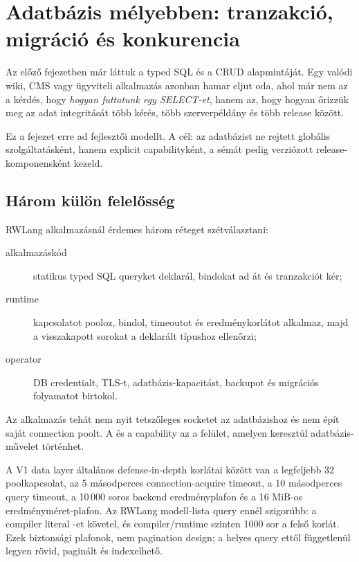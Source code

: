 \chapter{Adatbázis mélyebben: tranzakció, migráció és konkurencia}\label{ch:db-deep-dive-hu}

Az előző fejezetben már láttuk a typed SQL és a CRUD alapmintáját. Egy valódi wiki, CMS vagy ügyviteli alkalmazás azonban hamar eljut oda, ahol már nem az a kérdés, hogy \emph{hogyan futtatunk egy SELECT-et}, hanem az, hogy hogyan őrizzük meg az adat integritását több kérés, több szerverpéldány és több release között.

Ez a fejezet erre ad fejlesztői modellt. A cél: az adatbázist ne rejtett globális szolgáltatásként, hanem explicit capabilityként, a sémát pedig verziózott release-komponensként kezeld.

\section{Három külön felelősség}

RWLang alkalmazásnál érdemes három réteget szétválasztani:

\begin{description}
\item[alkalmazáskód] statikus typed SQL queryket deklarál, bindokat ad át és tranzakciót kér;
\item[runtime] kapcsolatot pooloz, bindol, timeoutot és eredménykorlátot alkalmaz, majd a visszakapott sorokat a deklarált típushoz ellenőrzi;
\item[operator] DB credentialt, TLS-t, adatbázis-kapacitást, backupot és migrációs folyamatot birtokol.
\end{description}

Az alkalmazás tehát nem nyit tetszőleges socketet az adatbázishoz és nem épít saját connection poolt. A  és a  capability az a felület, amelyen keresztül adatbázis-művelet történhet.

A V1 data layer általános defense-in-depth korlátai között van a legfeljebb 32 poolkapcsolat, az 5 másodperces connection-acquire timeout, a 10 másodperces query timeout, a 10\,000 soros backend eredményplafon és a 16 MiB-os eredményméret-plafon. Az RWLang modell-lista query ennél szigorúbb: a compiler literal -et követel, és compiler/runtime szinten 1000 sor a felső korlát. Ezek biztonsági plafonok, nem pagination design; a helyes query ettől függetlenül legyen rövid, paginált és indexelhető.


